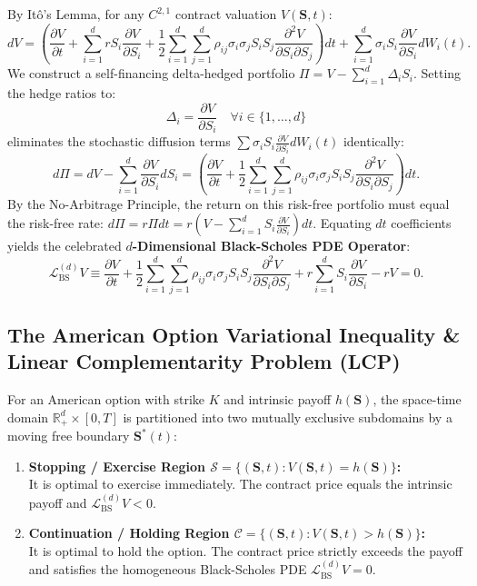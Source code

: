 \documentclass[11pt,a4paper]{article}
\begin{document}
By It\^o's Lemma, for any $C^{2,1}$ contract valuation $V(\mathbf{S}, t)$:
\begin{equation}
    dV = \left( \frac{\partial V}{\partial t} + \sum_{i=1}^d r S_i \frac{\partial V}{\partial S_i} + \frac{1}{2}\sum_{i=1}^d \sum_{j=1}^d \rho_{ij} \sigma_i \sigma_j S_i S_j \frac{\partial^2 V}{\partial S_i \partial S_j} \right) dt + \sum_{i=1}^d \sigma_i S_i \frac{\partial V}{\partial S_i} dW_i(t).
\end{equation}
We construct a self-financing delta-hedged portfolio $\Pi = V - \sum_{i=1}^d \Delta_i S_i$. Setting the hedge ratios to:
\begin{equation}
    \Delta_i = \frac{\partial V}{\partial S_i} \quad \forall i \in \{1, \dots, d\}
\end{equation}
eliminates the stochastic diffusion terms $\sum \sigma_i S_i \frac{\partial V}{\partial S_i} dW_i(t)$ identically:
\begin{equation}
    d\Pi = dV - \sum_{i=1}^d \frac{\partial V}{\partial S_i} dS_i = \left( \frac{\partial V}{\partial t} + \frac{1}{2}\sum_{i=1}^d \sum_{j=1}^d \rho_{ij} \sigma_i \sigma_j S_i S_j \frac{\partial^2 V}{\partial S_i \partial S_j} \right) dt.
\end{equation}
By the No-Arbitrage Principle, the return on this risk-free portfolio must equal the risk-free rate: $d\Pi = r \Pi dt = r\left( V - \sum_{i=1}^d S_i \frac{\partial V}{\partial S_i} \right) dt$. Equating $dt$ coefficients yields the celebrated \textbf{$d$-Dimensional Black-Scholes PDE Operator}:
\begin{equation}
\boxed{\mathcal{L}_{\text{BS}}^{(d)} V \equiv \frac{\partial V}{\partial t} + \frac{1}{2}\sum_{i=1}^d \sum_{j=1}^d \rho_{ij} \sigma_i \sigma_j S_i S_j \frac{\partial^2 V}{\partial S_i \partial S_j} + r \sum_{i=1}^d S_i \frac{\partial V}{\partial S_i} - r V = 0.}
\end{equation}

\subsection{The American Option Variational Inequality \& Linear Complementarity Problem (LCP)}
For an American option with strike $K$ and intrinsic payoff $h(\mathbf{S})$, the space-time domain $\mathbb{R}_+^d \times [0, T]$ is partitioned into two mutually exclusive subdomains by a moving free boundary $\mathbf{S}^*(t)$:
\begin{enumerate}[leftmargin=1.5em]
    \item \textbf{Stopping / Exercise Region $\mathcal{S} = \{(\mathbf{S},t) : V(\mathbf{S}, t) = h(\mathbf{S})\}$:} \\
    It is optimal to exercise immediately. The contract price equals the intrinsic payoff and $\mathcal{L}_{\text{BS}}^{(d)} V < 0$.
    \item \textbf{Continuation / Holding Region $\mathcal{C} = \{(\mathbf{S},t) : V(\mathbf{S}, t) > h(\mathbf{S})\}$:} \\
    It is optimal to hold the option. The contract price strictly exceeds the payoff and satisfies the homogeneous Black-Scholes PDE $\mathcal{L}_{\text{BS}}^{(d)} V = 0$.
\end{enumerate}
\end{document}
